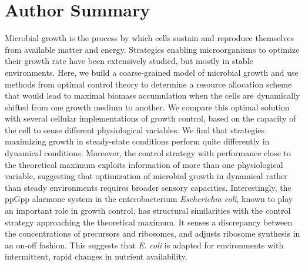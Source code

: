 \section*{Author Summary}
Microbial growth is the process by which cells sustain and reproduce themselves from available matter and energy.
Strategies enabling microorganisms to optimize their growth rate have been extensively studied, but mostly in stable environments.
Here, we build a coarse-grained model of microbial growth and use methods from optimal control theory to determine a resource allocation scheme that would lead to maximal biomass accumulation when the cells are dynamically shifted from one growth medium to another.
We compare this optimal solution with several cellular implementations of growth control, based on the capacity of the cell to sense different physiological variables.
We find that strategies maximizing growth in steady-state conditions perform quite differently in dynamical conditions.  
Moreover, the control strategy with performance close to the theoretical maximum exploits information of more than one physiological variable, suggesting that optimization of microbial growth in dynamical rather than steady environments requires broader sensory capacities.
Interestingly, the ppGpp alarmone system in the enterobacterium \textit{Escherichia coli}, known to play an important role in growth control, has structural similarities with the control strategy approaching the theoretical maximum.
It senses a discrepancy between the concentrations of precursors and ribosomes, and adjusts ribosome synthesis in an on-off fashion.
This suggests that \textit{E. coli} is adapted for environments with intermittent, rapid changes in nutrient availability.